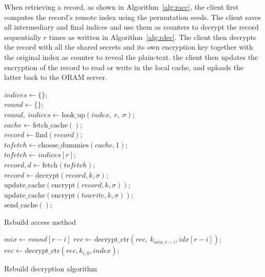 \documentclass[USenglish,oneside,twocolumn]{article}
\begin{document}
When retrieving a record, as shown in Algorithm~\ref{alg:racc}, the client first computes the record's remote index using the permutation seeds. The client saves all intermediary and final indices and use them as counters to decrypt the record sequentially $r$ times as written in Algorithm~\ref{alg:rdec}. The client then decrypts the record with all the shared secrets and its own encryption key together with the original index as counter to reveal the plain-text. the client then updates the encryption of the record to read or write in the local cache, and uploads the latter back to the ORAM server.\\

\begin{algorithm}
\DontPrintSemicolon
{}
$indices \gets \{\}$;\\
$round\gets \{\}$;\\
{
$round,\ indices \gets \text{look\_up}(index,\ r,\ \sigma)$;\\
}
$cache \gets \text{fetch\_cache}()$;\\
{
$record \gets \text{find}(record)$;\\
$tofetch \gets \text{choose\_dummies}(cache, 1)$;\\
}
\Else
{
$tofetch \gets indices[r]$;\\
}
$record, d \gets \text{fetch}(tofetch)$;\\
$record \gets \text{decrypt}(record,k,\sigma)$;\\
{
$\text{update\_cache}(\text{encrypt}(record,k,\sigma))$;\\
}
\Else
{
$\text{update\_cache}(\text{encrypt}(towrite,k,\sigma))$;\\
}
$\text{send\_cache}()$;\\
\caption{Rebuild access method}
\label{alg:racc}
\end{algorithm}

\begin{algorithm}
\DontPrintSemicolon
{}
{
$mix \gets round[r-i]$
$rec \gets \text{decrypt\_ctr}(rec,\ k_{mix,r-i}, idx[r-i] )$;\\
}
{
$rec \gets \text{decrypt\_ctr}(rec, k_{i,0}, index )$;\\
}
\caption{Rebuild decryption algorithm}
\label{alg:rdec}
\end{algorithm}
\end{document}
